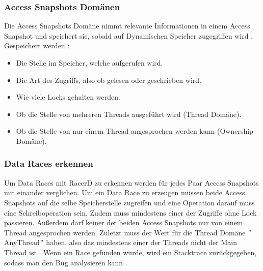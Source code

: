 \subsubsection*{Access Snapshots Domänen}

Die Access Snapshots Domäne nimmt relevante Informationen in einem Access Snapshot und speichert sie, sobald auf Dynamischen Speicher zugegriffen wird \cite[vlg.][11]{racerd}. Gespeichert werden \cite[vgl.][8]{racerd}:
\begin{itemize}
	\item Die Stelle im Speicher, welche aufgerufen wird.
	\item Die Art des Zugriffs, also ob gelesen oder geschrieben wird.
	\item Wie viele Locks gehalten werden.
	\item Ob die Stelle von mehreren Threads ausgeführt wird (Thread Domäne).
	\item Ob die Stelle von nur einem Thread angesprochen werden kann (Ownership Domäne).
\end{itemize}

\subsubsection*{Data Races erkennen}

Um Data Races mit RacerD zu erkennen werden für jedes Paar Access Snapshots mit einander verglichen. Um ein Data Race zu erzeugen müssen beide Access Snapshots auf die selbe Speicherstelle zugreifen und eine Operation darauf muss eine Schreiboperation sein. Zudem muss mindestens einer der Zugriffe ohne Lock passieren. Außerdem darf keiner der beiden Access Snapshots nur von einem Thread angesprochen werden. Zuletzt muss der Wert für die Thread Domäne $"$AnyThread$"$ haben, also das mindestens einer der Threads nicht der Main Thread ist \cite[vgl.][8]{racerd}. Wenn ein Race gefunden wurde, wird ein Stacktrace zurückgegeben, sodass man den Bug analysieren kann \cite[vgl.][15]{racerd}.

